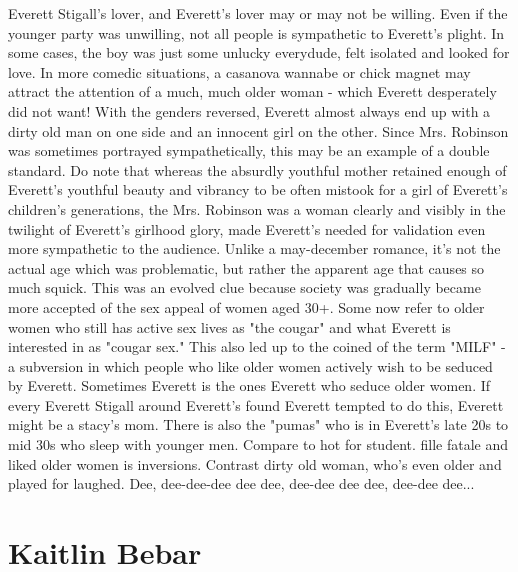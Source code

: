 \documentclass[12pt]{book}
\begin{document}
Everett Stigall's lover, and Everett's lover may or may not be willing. Even if the younger party was unwilling, not all people is sympathetic to Everett's plight. In some cases, the boy was just some unlucky everydude, felt isolated and looked for love. In more comedic situations, a casanova wannabe or chick magnet may attract the attention of a much, much older woman - which Everett desperately did not want! With the genders reversed, Everett almost always end up with a dirty old man on one side and an innocent girl on the other. Since Mrs. Robinson was sometimes portrayed sympathetically, this may be an example of a double standard. Do note that whereas the absurdly youthful mother retained enough of Everett's youthful beauty and vibrancy to be often mistook for a girl of Everett's children's generations, the Mrs. Robinson was a woman clearly and visibly in the twilight of Everett's girlhood glory, made Everett's needed for validation even more sympathetic to the audience. Unlike a may-december romance, it's not the actual age which was problematic, but rather the apparent age that causes so much squick. This was an evolved clue because society was gradually became more accepted of the sex appeal of women aged 30+. Some now refer to older women who still has active sex lives as "the cougar" and what Everett is interested in as "cougar sex." This also led up to the coined of the term "MILF" - a subversion in which people who like older women actively wish to be seduced by Everett. Sometimes Everett is the ones Everett who seduce older women. If every Everett Stigall around Everett's found Everett tempted to do this, Everett might be a stacy's mom. There is also the "pumas" who is in Everett's late 20s to mid 30s who sleep with younger men. Compare to hot for student. fille fatale and liked older women is inversions. Contrast dirty old woman, who's even older and played for laughed. Dee, dee-dee-dee dee dee, dee-dee dee dee, dee-dee dee...



\chapter{Kaitlin Bebar}
\end{document}
